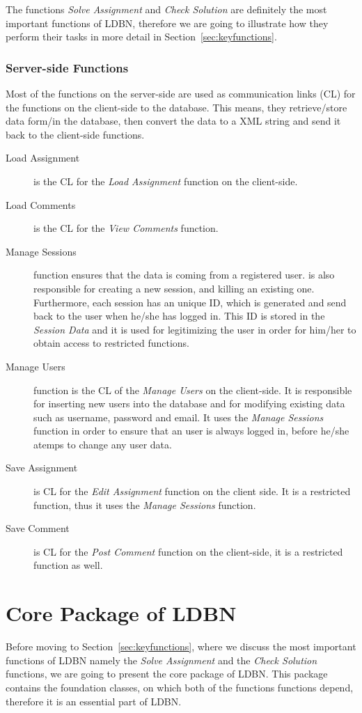 The functions \textit{Solve Assignment} and \textit{Check Solution} are definitely the most 
important functions of LDBN, therefore we are going to illustrate how they perform their tasks
in more detail in Section~\ref{sec:keyfunctions}. 

\subsubsection{Server-side Functions}

Most of the functions on the server-side are used as communication links (CL) for the
functions on the client-side to the database. This means, they retrieve/store data form/in the 
database, then convert the data to a XML string and send it back to the client-side
functions. 

\begin{description}
	\item[Load Assignment] is the CL for the \textit{Load Assignment} function on the 
		client-side.
	\item[Load Comments] is the CL for the \textit{View Comments} function.
	\item[Manage Sessions] function ensures that the data is coming from a registered user.
		is also responsible for creating a new session, and killing an existing one. Furthermore,
		each session has an unique ID, which is generated and send back to the user 
		when he/she has logged in. This ID is stored in the \textit{Session Data} and it is used for
		legitimizing the user in order for him/her to obtain access to restricted functions.
	\item[Manage Users] function is the CL of the \textit{Manage Users} on the client-side.
		It is responsible 
		for inserting new users into the database and for modifying existing data such as 
		username, password and email.
		It uses the \textit{Manage Sessions} function in order to ensure that an 
		user is always logged in, before he/she atemps to change any user data.  
	\item[Save Assignment] is CL for the \textit{Edit Assignment} function on the client side. 
		It is a restricted function, thus it uses the \textit{Manage Sessions} function. 
	\item[Save Comment] is CL for the \textit{Post Comment} function on the client-side, it is 
		a restricted function as well.
\end{description} 

\section{Core Package of LDBN}
Before moving to Section~\ref{sec:keyfunctions}, where we discuss the  most important functions of 
LDBN namely the \textit{Solve Assignment} and the \textit{Check Solution} functions, 
we are going to present the core package of LDBN. This package contains the foundation 
classes, on which both of the functions functions depend, therefore it is an essential 
part of LDBN. 

